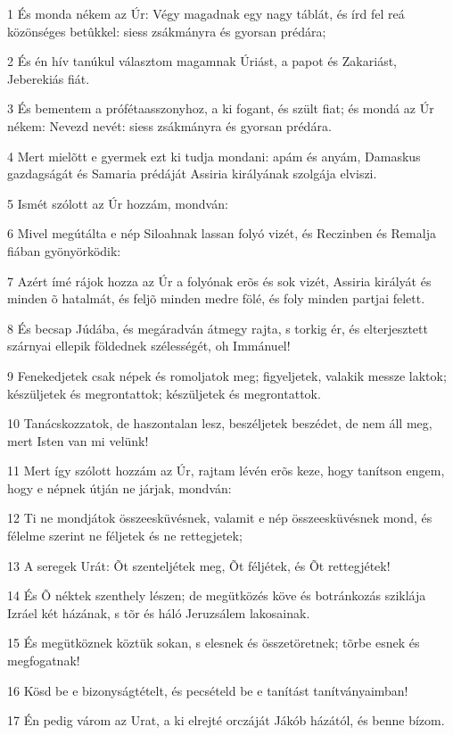 \par 1 És monda nékem az Úr: Végy magadnak egy nagy táblát, és írd fel reá közönséges betûkkel: siess zsákmányra és gyorsan prédára;
\par 2 És én hív tanúkul választom magamnak Úriást, a papot és Zakariást, Jeberekiás fiát.
\par 3 És bementem a prófétaasszonyhoz, a ki fogant, és szült fiat; és mondá az Úr nékem: Nevezd nevét: siess zsákmányra és gyorsan prédára.
\par 4 Mert mielõtt e gyermek ezt ki tudja mondani: apám és anyám, Damaskus gazdagságát és Samaria prédáját Assiria királyának szolgája elviszi.
\par 5 Ismét szólott az Úr hozzám, mondván:
\par 6 Mivel megútálta e nép Siloahnak lassan folyó vizét, és Reczinben és Remalja fiában gyönyörködik:
\par 7 Azért ímé rájok hozza az Úr a folyónak erõs és sok vizét, Assiria királyát és minden õ hatalmát, és feljõ minden medre fölé, és foly minden partjai felett.
\par 8 És becsap Júdába, és megáradván átmegy rajta, s torkig ér, és elterjesztett szárnyai ellepik földednek szélességét, oh Immánuel!
\par 9 Fenekedjetek csak népek és romoljatok meg; figyeljetek, valakik messze laktok; készüljetek és megrontattok; készüljetek és megrontattok.
\par 10 Tanácskozzatok, de haszontalan lesz, beszéljetek beszédet, de nem áll meg,  mert Isten van mi velünk!
\par 11 Mert így szólott hozzám az Úr, rajtam lévén erõs keze, hogy tanítson engem, hogy e népnek útján ne járjak, mondván:
\par 12 Ti ne mondjátok összeesküvésnek, valamit e nép összeesküvésnek mond, és félelme szerint ne féljetek és ne rettegjetek;
\par 13 A seregek Urát: Õt szenteljétek meg, Õt féljétek, és Õt rettegjétek!
\par 14 És Õ néktek szenthely lészen; de megütközés köve és botránkozás sziklája Izráel két házának, s tõr és háló Jeruzsálem lakosainak.
\par 15 És megütköznek köztük sokan, s elesnek és összetöretnek; tõrbe esnek és megfogatnak!
\par 16 Kösd be e bizonyságtételt, és pecsételd be e tanítást tanítványaimban!
\par 17 Én pedig várom az Urat, a ki elrejté orczáját Jákób házától, és benne bízom.

